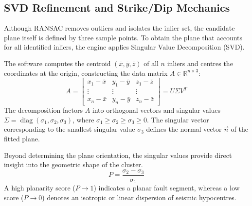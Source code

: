 \subsection{SVD Refinement and Strike/Dip Mechanics}

Although RANSAC removes outliers and isolates the inlier set, the candidate plane itself is defined by three sample points. To obtain the plane that accounts for all identified inliers, the engine applies Singular Value Decomposition (SVD).

The software computes the centroid $(\bar{x}, \bar{y}, \bar{z})$ of all $n$ inliers and centres the coordinates at the origin, constructing the data matrix $A \in \mathbb{R}^{n \times 3}$:
\begin{equation}
    A = \begin{bmatrix}
        x_1 - \bar{x} & y_1 - \bar{y} & z_1 - \bar{z} \\
        \vdots & \vdots & \vdots \\
        x_n - \bar{x} & y_n - \bar{y} & z_n - \bar{z}
    \end{bmatrix}
    = U \Sigma V^T
    \label{eq:svd}
\end{equation}
The decomposition factors $A$ into orthogonal vectors and singular values $\Sigma = \operatorname{diag}(\sigma_1, \sigma_2, \sigma_3)$, where $\sigma_1 \ge \sigma_2 \ge \sigma_3 \ge 0$. The singular vector corresponding to the smallest singular value $\sigma_3$ defines the normal vector $\vec{n}$ of the fitted plane.

Beyond determining the plane orientation, the singular values provide direct insight into the geometric shape of the cluster. 
\begin{equation}
    P = \frac{\sigma_2 - \sigma_3}{\sigma_1}
    \label{eq:planarity}
\end{equation}
A high planarity score ($P \to 1$) indicates a planar fault segment, whereas a low score ($P \to 0$) denotes an isotropic or linear dispersion of seismic hypocentres.

